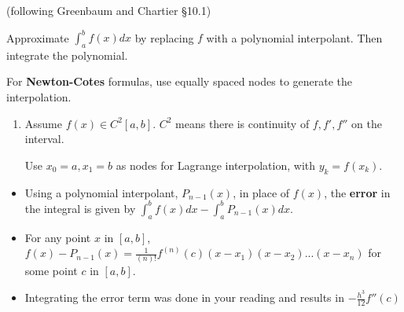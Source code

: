 \documentclass[12pt,letterpaper,noanswers]{exam}
\begin{document}
(following Greenbaum and Chartier \S 10.1)

\begin{tcolorbox}
Approximate $\displaystyle\int_a^b f(x)dx$ by replacing $f$ with a polynomial interpolant.  Then integrate the polynomial.

For \textbf{Newton-Cotes} formulas, use equally spaced nodes to generate the interpolation.
\end{tcolorbox}
\begin{enumerate}[resume=classQ]
\item Assume $f(x) \in C^2[a,b]$.  $C^2$ means there is continuity of $f, f', f''$ on the interval.  

Use $x_0 = a, x_1 = b$ as nodes for Lagrange interpolation, with $y_k = f(x_k)$.
\end{enumerate}

\begin{tcolorbox}
\begin{itemize}
\itemsep0pt
    \item Using a polynomial interpolant, $P_{n-1}(x)$, in place of $f(x)$, the \textbf{error} in the integral is given by $\displaystyle\int_a^bf(x)dx - \int_a^b P_{n-1}(x)dx.$
    \item For any point $x$ in $[a,b]$, $\displaystyle f(x) - P_{n-1}(x) = \frac{1}{(n)!}f^{(n)}(c)(x-x_1)(x-x_2)...(x-x_n)$ for some point $c$ in $[a,b]$.
    \item Integrating the error term was done in your reading and results in $-\frac{h^3}{12} f''(c)$
\end{itemize}
\end{tcolorbox}

\end{document}
